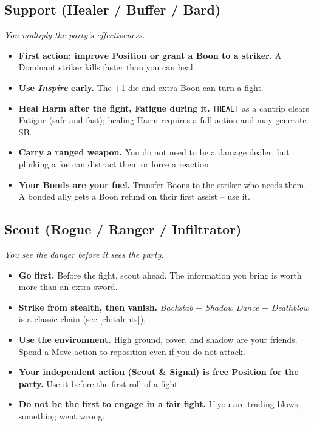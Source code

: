 \subsection{Support (Healer / Buffer / Bard)}
\textit{You multiply the party's effectiveness.}
\begin{itemize}
  \item \textbf{First action: improve Position or grant a Boon to a striker.} A Dominant striker kills faster than you can heal.
  \item \textbf{Use \emph{Inspire} early.} The +1 die and extra Boon can turn a fight.
  \item \textbf{Heal Harm after the fight, Fatigue during it.} \texttt{[HEAL]} as a cantrip clears Fatigue (safe and fast); healing Harm requires a full action and may generate SB.
  \item \textbf{Carry a ranged weapon.} You do not need to be a damage dealer, but plinking a foe can distract them or force a reaction.
  \item \textbf{Your Bonds are your fuel.} Transfer Boons to the striker who needs them. A bonded ally gets a Boon refund on their first assist -- use it.
\end{itemize}

\subsection{Scout (Rogue / Ranger / Infiltrator)}
\textit{You see the danger before it sees the party.}
\begin{itemize}
  \item \textbf{Go first.} Before the fight, scout ahead. The information you bring is worth more than an extra sword.
  \item \textbf{Strike from stealth, then vanish.} \emph{Backstab} + \emph{Shadow Dance} + \emph{Deathblow} is a classic chain (see \ref{ch:talents}).
  \item \textbf{Use the environment.} High ground, cover, and shadow are your friends. Spend a Move action to reposition even if you do not attack.
  \item \textbf{Your independent action (Scout \& Signal) is free Position for the party.} Use it before the first roll of a fight.
  \item \textbf{Do not be the first to engage in a fair fight.} If you are trading blows, something went wrong.
\end{itemize}


